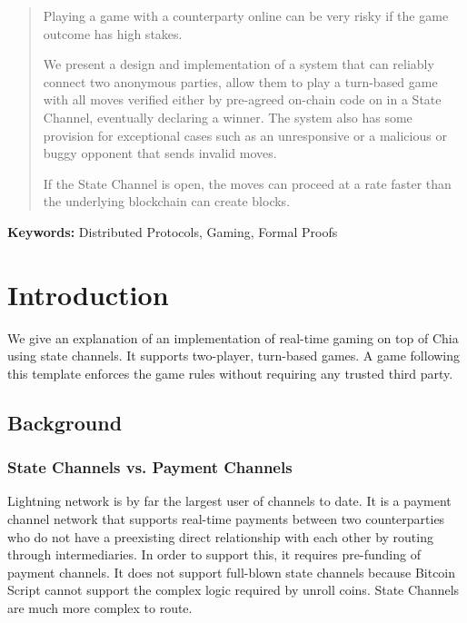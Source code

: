\documentclass[a4paper]{article}
\begin{document}
\begin{multicols}{2}
\setlength{\columnsep}{0.5cm}

\begin{abstract}
Playing a game with a counterparty online can be very risky if the game outcome has high stakes.

We present a design and implementation of a system that can reliably connect two anonymous parties, allow them to play a turn-based game with all moves verified either by pre-agreed on-chain code on in a State Channel, eventually declaring a winner. The system also has some provision for exceptional cases such as an unresponsive or a malicious or buggy opponent that sends invalid moves.

If the State Channel is open, the moves can proceed at a rate faster than the underlying blockchain can create blocks.


\end{abstract} \hspace{10pt}

{\bf Keywords:} Distributed Protocols, Gaming, Formal Proofs

\section{Introduction}
We give an explanation of an implementation of real-time gaming on top of Chia using state channels. It supports two-player, turn-based games. A game following this template enforces the game rules without requiring any trusted third party.

\subsection{Background}

\subsubsection{State Channels vs. Payment Channels}
Lightning network \cite{1} is by far the largest user of channels to date. It is a payment channel network that supports real-time payments between two counterparties who do not have a preexisting direct relationship with each other by routing through intermediaries. In order to support this, it requires pre-funding of payment channels. It does not support full-blown state channels because Bitcoin Script cannot support the complex logic required by unroll coins. State Channels are much more complex to route. 


\end{multicols}
\end{document}
